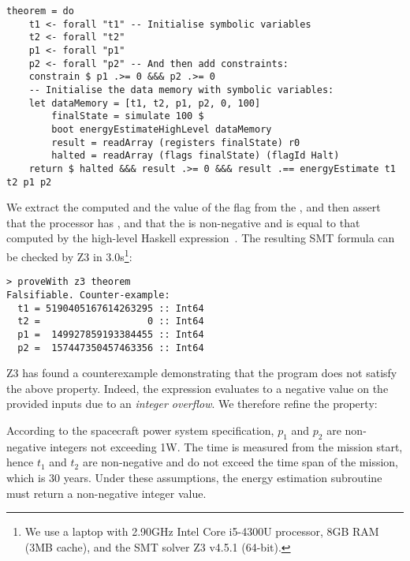 \vspace{1mm}
\begin{verbatim}
theorem = do
    t1 <- forall "t1" -- Initialise symbolic variables
    t2 <- forall "t2"
    p1 <- forall "p1"
    p2 <- forall "p2" -- And then add constraints:
    constrain $ p1 .>= 0 &&& p2 .>= 0
    -- Initialise the data memory with symbolic variables:
    let dataMemory = [t1, t2, p1, p2, 0, 100]
        finalState = simulate 100 $
        boot energyEstimateHighLevel dataMemory
        result = readArray (registers finalState) r0
        halted = readArray (flags finalState) (flagId Halt)
    return $ halted &&& result .>= 0 &&& result .== energyEstimate t1 t2 p1 p2
\end{verbatim}
\vspace{1mm}

\noindent
We extract the computed  and the value of the flag  from the
, and then assert that the processor has , and that
the  is non-negative and is equal to that computed by the high-level
Haskell expression~.
The resulting SMT formula can be checked by Z3 in
3.0s\footnote{We use a laptop with 2.90GHz Intel Core i5-4300U processor, 8GB
RAM (3MB cache), and the SMT solver Z3 v4.5.1 (64-bit).}:

\vspace{1mm}
\begin{verbatim}
> proveWith z3 theorem
Falsifiable. Counter-example:
  t1 = 5190405167614263295 :: Int64
  t2 =                   0 :: Int64
  p1 =  149927859193384455 :: Int64
  p2 =  157447350457463356 :: Int64
\end{verbatim}
\vspace{1mm}

\noindent
Z3 has found a counterexample demonstrating that the program does not
satisfy the above property. Indeed, the expression evaluates to a negative
value on the provided inputs due to an \emph{integer overflow}. We therefore
refine the property:

\vspace{1mm}
\begin{tcolorbox}
According to the spacecraft power system specification, $p_1$ and $p_2$ are
non-negative integers not exceeding 1W. The time is measured
from the mission start, hence $t_1$ and $t_2$ are non-negative and do not exceed
the time span of the mission, which is 30 years. Under these assumptions,
the energy estimation subroutine must return a non-negative integer value.
\end{tcolorbox}
\vspace{1mm}

